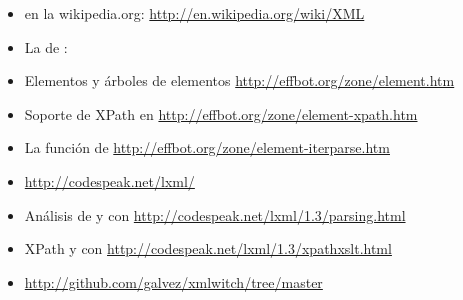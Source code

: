\begin{itemize}

\item {} en la wikipedia.org: \newline
\href{http://en.wikipedia.org/wiki/XML}{http://en.wikipedia.org/wiki/XML}

\item La  de : \newline
\href{}{}

\item Elementos y árboles de elementos \newline
\href{http://effbot.org/zone/element.htm}{http://effbot.org/zone/element.htm}

\item Soporte de XPath en  \newline
\href{http://effbot.org/zone/element-xpath.htm}{http://effbot.org/zone/element-xpath.htm}

\item La función  de  \newline
\href{http://effbot.org/zone/element-iterparse.htm}{http://effbot.org/zone/element-iterparse.htm}

\item {} \newline
\href{http://codespeak.net/lxml/}{http://codespeak.net/lxml/}

\item Análisis de  y  con  \newline
\href{http://codespeak.net/lxml/1.3/parsing.html}{http://codespeak.net/lxml/1.3/parsing.html}

\item XPath y  con  \newline
\href{http://codespeak.net/lxml/1.3/xpathxslt.html}{http://codespeak.net/lxml/1.3/xpathxslt.html}

\item {} \newline
\href{http://github.com/galvez/xmlwitch/tree/master}{http://github.com/galvez/xmlwitch/tree/master}

\end{itemize}


